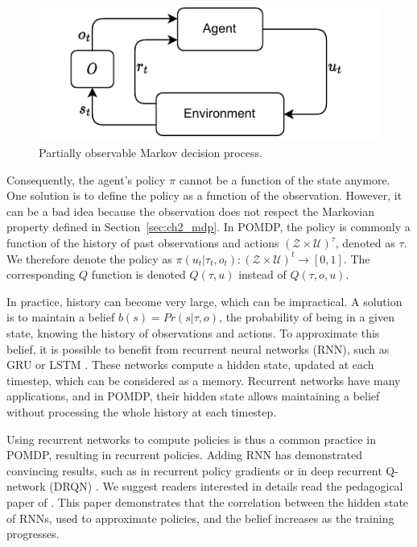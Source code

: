 \begin{figure}
    \centering
    \includegraphics[width=.8\linewidth]{tex_thesis/figures/ch2/POMDP.pdf}
    \caption{Partially observable Markov decision process.}
    \label{fig:ch2_pomdp}
\end{figure}


Consequently, the agent's policy $\pi$ cannot be a function of the state anymore.
One solution is to define the policy as a function of the observation.
However, it can be a bad idea because the observation does not respect the Markovian property defined in Section~\ref{sec:ch2_mdp}.
In POMDP, the policy is commonly a function of the history of past observations and actions $(\mathcal{Z} \times \mathcal{U})^\tau$, denoted as $\tau$.
We therefore denote the policy as $\pi(u_t|\tau_t,o_t): (\mathcal{Z} \times \mathcal{U})^t \rightarrow [0,1]$.
The corresponding $Q$ function is denoted $Q(\tau,u)$ instead of $Q(\tau,o, u)$.

In practice, history can become very large, which can be impractical.
A solution is to maintain a belief $b(s)=Pr(s|\tau,o)$, the probability of being in a given state, knowing the history of observations and actions.
To approximate this belief, it is possible to benefit from recurrent neural networks (RNN), such as GRU \citep{Chung2014EmpiricalModeling} or LSTM \citep{Hochreiter1997LongMemory}.
These networks compute a hidden state, updated at each timestep, which can be considered as a memory.
Recurrent networks have many applications, and in POMDP, their hidden state allows maintaining a belief without processing the whole history at each timestep.

Using recurrent networks to compute policies is thus a common practice in POMDP, resulting in recurrent policies.
Adding RNN has demonstrated convincing results, such as in recurrent policy gradients \citep{wierstra2010recurrent} or in deep recurrent Q-network (DRQN) \citep{Hausknecht2015DeepMDPs}.
We suggest readers interested in details read the pedagogical paper of \cite{lambrechts2022recurrent}.
This paper demonstrates that the correlation between the hidden state of RNNs, used to approximate policies, and the belief increases as the training progresses.


